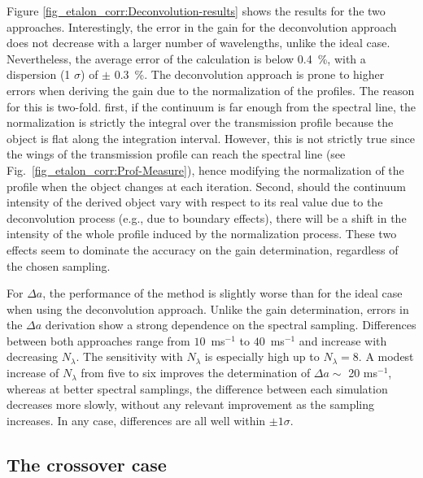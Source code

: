 Figure \ref{fig_etalon_corr:Deconvolution-results} shows the results for the two approaches. Interestingly, the error in the gain for the deconvolution approach does not decrease with a larger number of wavelengths, unlike the ideal case. Nevertheless, the average error of the calculation is below 0.4~\%, with a dispersion (1 $\sigma$) of $\pm$ 0.3~\%. The deconvolution approach is prone to higher errors when deriving the gain due to the normalization of the profiles. The reason for this is two-fold. first, if the continuum is far enough from the spectral line, the normalization is strictly the integral over the transmission profile because the object is flat along the integration interval. However, this is not strictly true since the wings of the transmission profile can reach the spectral line (see Fig.~\ref{fig_etalon_corr:Prof-Measure}), hence modifying the normalization of the profile when the object changes at each iteration. Second, should the continuum intensity of the derived object vary with respect to its real value due to the deconvolution process (e.g., due to boundary effects), there will be a shift in the intensity of the whole profile induced by the normalization process. These two effects seem to dominate the accuracy on the gain determination, regardless of the chosen sampling.

For $\Delta a$, the performance of the method is slightly worse than for the ideal case when using the deconvolution approach. Unlike the gain determination, errors in the $\Delta a$ derivation show a strong dependence on the spectral sampling. Differences between both approaches range from $10$~ms$^{-1}$ to $40$~ms$^{-1}$ and increase with decreasing $N_\lambda$. The sensitivity with $N_\lambda$ is especially high up to $N_\lambda = 8$. A modest increase of $N_\lambda$ from five to six improves the determination of $\Delta a \sim$ 20 ms$^{-1}$, whereas at better spectral samplings, the difference between each simulation decreases more slowly, without any relevant improvement as the sampling increases. In any case, differences are all well within $\pm 1\sigma$.

\subsection{The crossover case}

